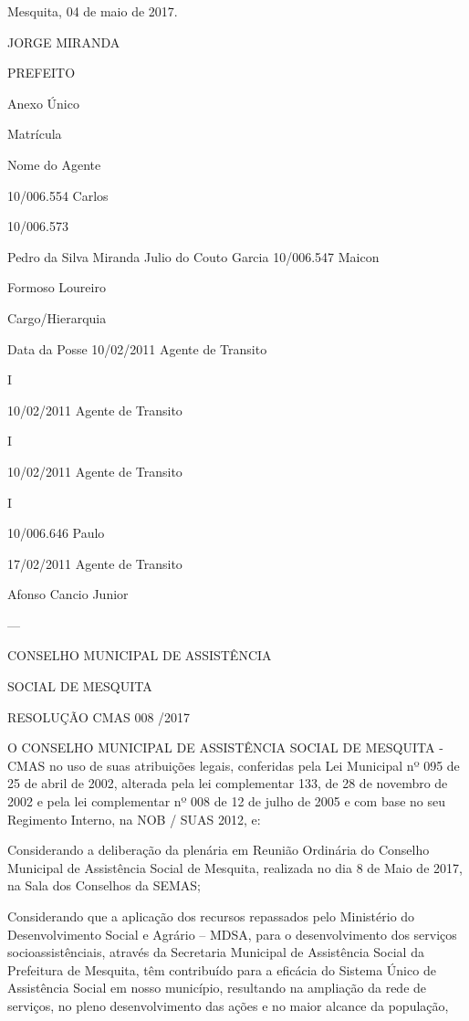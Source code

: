 \documentclass{doliberto}
\begin{document}
  Mesquita, 04 de maio de 2017. 

JORGE MIRANDA 

PREFEITO  

Anexo Único 

Matrícula 

Nome do 
Agente 

10/006.554  Carlos 

10/006.573 

Pedro da 
Silva 
Miranda 
Julio do 
Couto 
Garcia 
10/006.547  Maicon 

Formoso 
Loureiro 

Cargo/Hierarquia 

Data da 
Posse 
10/02/2011  Agente de Transito 

I 

10/02/2011  Agente de Transito 

I 

10/02/2011  Agente de Transito 

I 

10/006.646  Paulo 

17/02/2011  Agente de Transito 

Afonso 
Cancio 
Junior 


---

CONSELHO MUNICIPAL DE ASSISTÊNCIA 

SOCIAL DE MESQUITA 

RESOLUÇÃO CMAS 008 /2017 

 
O  CONSELHO  MUNICIPAL  DE  ASSISTÊNCIA  SOCIAL  DE 
MESQUITA  -  CMAS  no  uso  de  suas  atribuições  legais, 
conferidas pela Lei Municipal nº 095 de 25 de abril de 2002, 
alterada pela lei complementar 133, de 28 de novembro de 
2002 e pela lei complementar nº 008 de 12 de julho de 2005 
e com base no seu Regimento Interno, na NOB / SUAS 2012, 
e:  
 

Considerando  a  deliberação  da  plenária  em  Reunião 
Ordinária  do  Conselho  Municipal  de  Assistência  Social  de 
Mesquita,  realizada  no  dia  8  de  Maio  de  2017,  na  Sala  dos 
Conselhos da SEMAS;  
 
Considerando que a aplicação dos recursos repassados pelo 
Ministério  do  Desenvolvimento  Social  e  Agrário  –  MDSA, 
para  o  desenvolvimento  dos  serviços  socioassistênciais, 
através  da  Secretaria  Municipal  de  Assistência  Social  da 
Prefeitura  de  Mesquita,  têm  contribuído  para  a  eficácia  do 
Sistema  Único  de  Assistência  Social  em  nosso  município, 
resultando  na  ampliação  da  rede  de  serviços,  no  pleno 
desenvolvimento das ações e no maior alcance da população,  
 
\end{document}
